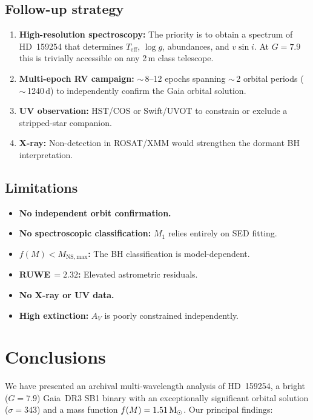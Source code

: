\documentclass[usenatbib,fleqn]{mnras}
\newcommand{\Msun}{{\rm M}_\odot}
\newcommand{\fmass}{f(M)}
\begin{document}
\subsection{Follow-up strategy}
\label{sec:followup}

\begin{enumerate}
\item \textbf{High-resolution spectroscopy:} The priority is to
  obtain a spectrum of HD~159254 that determines
  $T_\mathrm{eff}$, $\log g$, abundances, and $v \sin i$.
  At $G = 7.9$ this is trivially accessible on any 2\,m class
  telescope.
\item \textbf{Multi-epoch RV campaign:} $\sim$\,8--12 epochs
  spanning $\sim$\,2 orbital periods ($\sim$\,1240\,d) to
  independently confirm the Gaia orbital solution.
\item \textbf{UV observation:} HST/COS or Swift/UVOT to
  constrain or exclude a stripped-star companion.
\item \textbf{X-ray:} Non-detection in ROSAT/XMM would
  strengthen the dormant BH interpretation.
\end{enumerate}

\subsection{Limitations}
\label{sec:limitations}

\begin{itemize}
\item \textbf{No independent orbit confirmation.}
\item \textbf{No spectroscopic classification:} $M_1$ relies
  entirely on SED fitting.
\item \textbf{$\fmass < M_\mathrm{NS,max}$:} The BH
  classification is model-dependent.
\item \textbf{RUWE\,$= 2.32$:} Elevated astrometric residuals.
\item \textbf{No X-ray or UV data.}
\item \textbf{High extinction:} $A_V$ is poorly constrained independently.
\end{itemize}

\section{Conclusions}
\label{sec:conclusions}

We have presented an archival multi-wavelength analysis of
HD~159254, a bright ($G = 7.9$) Gaia~DR3 SB1 binary with an
exceptionally significant orbital solution ($\sigma = 343$) and a
mass function $\fmass = 1.51\,\Msun$.  Our principal findings:
\end{document}
